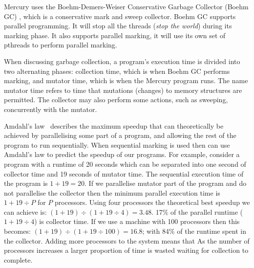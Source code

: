 Mercury uses the Boehm-Demers-Weiser Conservative Garbage Collector (Boehm GC)
\citep{boehm_gc},
which is a conservative mark and sweep collector.
Boehm GC supports parallel programming.
It will stop all the threads (\emph{stop the world}) during its marking
phase.
It also supports parallel marking,
it will use its own set of pthreads to perform parallel marking.

When discussing garbage collection,
a program's execution time is divided into two alternating phases:
collection time, which is when Boehm GC performs marking,
and mutator time, which is when the Mercury program runs.
The name mutator time refers to time that mutations (changes) to memory
structures are permitted.
The collector may also perform some actions,
such as sweeping,
concurrently with the mutator.

Amdahl's law~\citep{amdahl} describes the maximum speedup that
can theoretically  be achieved by parallelising some part of a program,
and allowing the rest of the program to run sequentially.
When sequential marking is used then can use Amdahl's
law to predict the speedup of our programs.
For example, consider a program with a runtime of 20 seconds
which can be separated into one second of collector time and 19 seconds
of mutator time.
The sequential execution time of the program is $1 + 19 = 20$.
If we parallelise mutator part of the program and do not parallelise the
collector then the minimum parallel execution time is $1 + 19{\div}P$
for $P$ processors.
Using four processors the theoretical best speedup we can achieve is:
$(1 + 19) \div (1 + 19\div4) = 3.48$.
17\% of the parallel runtime ($1 + 19\div4$) is collector time.
If we use a machine with 100 processors then this becomes:
$(1 + 19) \div (1 + 19\div100) = 16.8$;
with 84\% of the runtime spent in the collector.
Adding more processors to the system means that
As the number of processors increases a larger proportion of time is
wasted waiting for collection to complete.

